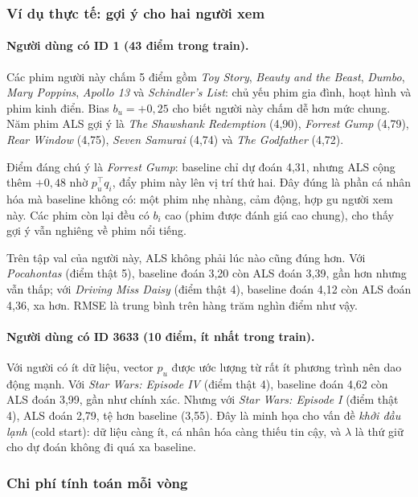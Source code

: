 \subsubsection{Ví dụ thực tế: gợi ý cho hai người xem}

\paragraph{Người dùng có ID 1 (43 điểm trong train).}
Các phim người này chấm 5 điểm gồm \emph{Toy Story}, \emph{Beauty and the Beast}, \emph{Dumbo},
\emph{Mary Poppins}, \emph{Apollo 13} và \emph{Schindler's List}: chủ yếu phim gia đình, hoạt hình và phim
kinh điển. Bias $b_u = +0{,}25$ cho biết người này chấm dễ hơn mức chung. Năm phim ALS gợi ý là
\emph{The Shawshank Redemption} (4,90), \emph{Forrest Gump} (4,79), \emph{Rear Window} (4,75),
\emph{Seven Samurai} (4,74) và \emph{The Godfather} (4,72).

Điểm đáng chú ý là \emph{Forrest Gump}: baseline chỉ dự đoán 4,31, nhưng ALS cộng thêm $+0{,}48$ nhờ
$p_u^\top q_i$, đẩy phim này lên vị trí thứ hai. Đây đúng là phần cá nhân hóa mà baseline không có: một
phim nhẹ nhàng, cảm động, hợp gu người xem này. Các phim còn lại đều có $b_i$ cao (phim được đánh giá
cao chung), cho thấy gợi ý vẫn nghiêng về phim nổi tiếng.

Trên tập val của người này, ALS không phải lúc nào cũng đúng hơn. Với \emph{Pocahontas} (điểm thật 5),
baseline đoán 3,20 còn ALS đoán 3,39, gần hơn nhưng vẫn thấp; với \emph{Driving Miss Daisy} (điểm thật 4),
baseline đoán 4,12 còn ALS đoán 4,36, xa hơn. RMSE là trung bình trên hàng trăm nghìn điểm như vậy.

\paragraph{Người dùng có ID 3633 (10 điểm, ít nhất trong train).}
Với người có ít dữ liệu, vector $p_u$ được ước lượng từ rất ít phương trình nên dao động mạnh. Với
\emph{Star Wars: Episode IV} (điểm thật 4), baseline đoán 4,62 còn ALS đoán 3,99, gần như chính xác.
Nhưng với \emph{Star Wars: Episode I} (điểm thật 4), ALS đoán 2,79, tệ hơn baseline (3,55). Đây là minh họa
cho vấn đề \emph{khởi đầu lạnh} (cold start): dữ liệu càng ít, cá nhân hóa càng thiếu tin cậy, và $\lambda$
là thứ giữ cho dự đoán không đi quá xa baseline.

\subsubsection{Chi phí tính toán mỗi vòng}

